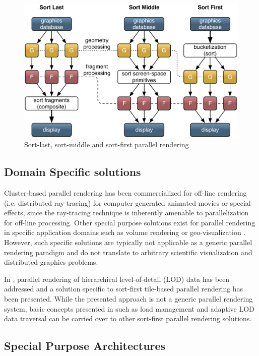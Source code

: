 \begin{figure}[h!t]\center
 \includegraphics[width=\textwidth]{images/all_sorts}%
 \caption{Sort-last, sort-middle and sort-first parallel rendering\label{fSorts}}
\end{figure}


\subsection{Domain Specific solutions}

Cluster-based parallel rendering has been commercialized for off-line rendering
(i.e. distributed ray-tracing) for computer generated animated movies or special
effects, since the ray-tracing technique is inherently amenable to
parallelization for off-line processing. Other special purpose solutions exist
for parallel rendering in specific application domains such as volume rendering
\cite{LWMT:97,Wittenbrink:98,HSCSM:00,SL:02,GS:02,NSJLYZ:05} or
geo-visualization \cite{VR:91,AG:95,LDC:96,JLMV:06}. However, such specific
solutions are typically not applicable as a generic parallel rendering paradigm
and do not translate to arbitrary scientific visualization and distributed
graphics problems.

In \cite{NC:07}, parallel rendering of hierarchical level-of-detail (LOD) data
has been addressed and a solution specific to sort-first tile-based parallel
rendering has been presented. While the presented approach is not a generic
parallel rendering system, basic concepts presented in \cite{NC:07} such as load
management and adaptive LOD data traversal can be carried over to other
sort-first parallel rendering solutions.

\subsection{Special Purpose Architectures}


